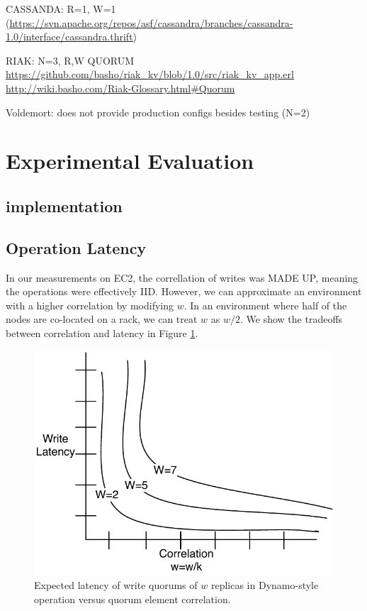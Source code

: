 \documentclass{vldb}
\begin{document}
CASSANDA: R=1, W=1 (\url{https://svn.apache.org/repos/asf/cassandra/branches/cassandra-1.0/interface/cassandra.thrift})

RIAK: N=3, R,W QUORUM \url{https://github.com/basho/riak_kv/blob/1.0/src/riak_kv_app.erl}
\url{http://wiki.basho.com/Riak-Glossary.html#Quorum}

Voldemort: does not provide production configs besides testing (N=2)

\section{Experimental Evaluation}
\label{sec:eval}

\subsection{implementation}

\subsection{Operation Latency}
\label{sec:real-latency}

In our measurements on EC2, the correllation of writes was MADE UP,
meaning the operations were effectively IID.  However, we can
approximate an environment with a higher correlation by modifying $w$.
In an environment where half of the nodes are co-located on a rack, we can treat $w$ as $w/2$.  We show the tradeoffs between correlation and latency in Figure \ref{fig:correlation}.

\begin{figure}
\centering
\includegraphics[width=.8\columnwidth]{figs/correlation.pdf}
\caption{Expected latency of write quorums of $w$ replicas in Dynamo-style operation versus quorum element correlation.}
\label{fig:correlation}
\end{figure}
\end{document}
